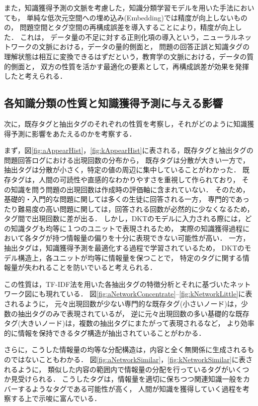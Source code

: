 また，知識獲得予測の文脈を考慮した，知識分類学習モデルを用いた手法においても，
単純な低次元空間への埋め込み(Embedding)では精度が向上しないものの，
問題空間とタグ空間の再構成誤差を導入することにより，精度が向上した．
これは，
データ量の不足に対する正則化項の導入という，ニューラルネットワークの文脈における，データの量的側面と，
問題の回答正誤と知識タグの理解状態は相互に変換できるはずだという，教育学の文脈における，データの質的側面と，
双方の性質を活かす最適化の要素として，再構成誤差が効果を発揮したと考えられる．



\subsection{各知識分類の性質と知識獲得予測に与える影響}
次に，既存タグと抽出タグのそれぞれの性質を考察し，それがどのように知識獲得予測に影響をあたえるのかを考察する．

まず，図\ref{fig:aAppearHist}，\ref{fig:kAppearHist}に表される，既存タグと抽出タグの問題回答ログにおける出現回数の分布から，
既存タグは分散が大きい一方で，抽出タグは分散が小さく，特定の値の周辺に集中していることがわかった．
既存タグは，人間の可読性や直感的なわかりやすさを重視して作られており，
その知識を問う問題の出現回数は作成時の評価軸に含まれていない．
そのため，基礎的・入門的な問題に関しては多くの生徒に回答される一方，
専門的であったり難易度の高い問題に関しては，回答される回数が必然的に少なくなるため，
タグ間で出現回数に差が出る．
しかし，DKTのモデルに入力される際には，どの知識タグも均等に１つのユニットで表現されるため，
実際の知識獲得過程において各タグが持つ情報量の偏りを十分に表現できない可能性が高い．
一方，抽出タグは，知識獲得予測を最適化する過程で学習されているため，
DKTのモデル構造上，各ユニットが均等に情報量を保つことで，
特定のタグに関する情報量が失われることを防いでいると考えられる．

この性質は，TF-IDF法を用いた各抽出タグの特徴分析とそれに基づいたネットワーク図にも現れている．
図\ref{fig:aNetworkConcentrate}--\ref{fig:kNetworkLittle}に表されるように，
元々出現回数が少ない専門的な既存タグ(小さいノード)は，少数の抽出タグのみで表現されているが，
逆に元々出現回数の多い基礎的な既存タグ(大きいノード)は，複数の抽出タグにまたがって表現されるなど，
より効率的に情報を保持できるタグ構造が抽出されていることがわかる．

さらに，こうした情報量の均等な分配構造は，内容と全く無関係に生成されるものではないこともわかる．
図\ref{fig:aNetworkSimilar}，\ref{fig:kNetworkSimilar}に表されるように，
類似した内容の範囲内で情報量の分配を行っているタグがいくつか見受けられる．
こうしたタグは，情報量を適切に保ちつつ関連知識一般をカバーするようなタグである可能性が高く，
人間が知識を獲得していく過程を考察する上で示唆に富んでいる．



